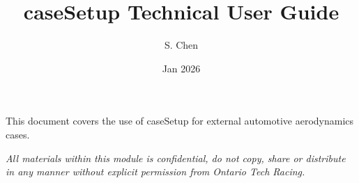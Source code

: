 \documentclass[11pt]{article}
\title{caseSetup Technical User Guide}
\author{S. Chen}
\date{Jan 2026}
\begin{document}
\vspace{5cm}
\maketitle


\vspace{2cm}

\small \noindent This document covers the use of caseSetup for external automotive aerodynamics cases.\newline


\noindent \textit{All materials within this  module is confidential, do not copy, share or distribute in any manner without explicit permission from Ontario Tech Racing.}
\newpage
\newpage
\tableofcontents
\newpage

\newpage






\newpage
\end{document}
